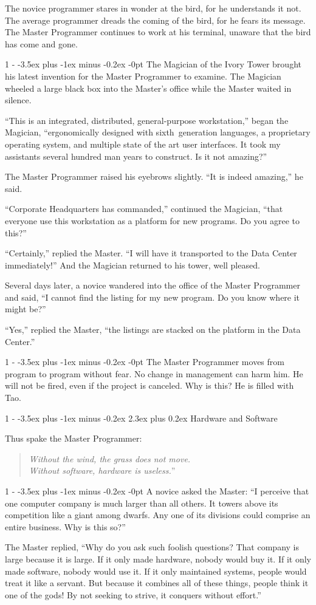 \documentclass[12pt,letterpaper,titlepage]{article}
\makeatletter
\newlength{\intomargin}\setlength{\intomargin}{25pt}
\renewcommand{\section}{%
\@startsection{section}%
{1}%
{-\intomargin}%
{-3.5ex plus -1ex minus -0.2ex}%
{2.3ex plus 0.2ex}%
{\clearpage\normalfont\Large\bfseries\color{my-red}}%
}
\renewcommand{\subsection}{%
\@startsection{subsection}%
{1}%
{-\intomargin}%
{-3.5ex plus -1ex minus -0.2ex}%
{-0pt}%
{\normalfont\normalsize\bfseries\color{my-red}}%
}
\newcommand{\book}[2]{\section{#1}%
\par\hspace{-\intomargin}Thus spake the Master Programmer:%
\begin{quotation}\color{my-gray}\noindent\llap{``}\textsl{#2}''\end{quotation}\medskip}
\newcommand{\sect}{\subsection{}}
\makeatother
\begin{document}
The novice programmer stares in wonder at the bird, for he understands
it not. The average programmer dreads the coming of the bird, for he
fears its message. The Master Programmer continues to work at his
terminal, unaware that the bird has come and gone.

\sect
The Magician of the Ivory Tower brought his latest invention for the
Master Programmer to examine. The Magician wheeled a large black box
into the Master's office while the Master waited in silence.

``This is an integrated, distributed, general-purpose workstation,''
began the Magician, ``ergonomically designed with sixth~generation languages, a proprietary operating
system, and multiple state of the art user interfaces. It took my assistants several hundred man
years to construct. Is it not amazing?''

The Master Programmer raised his eyebrows slightly. ``It is indeed
amazing,'' he said.

``Corporate Headquarters has commanded,'' continued the Magician,
``that everyone use this workstation as a platform for new
programs. Do you agree to this?''

``Certainly,'' replied the Master. ``I will have it transported to the
Data Center immediately!'' And the Magician returned to his tower,
well pleased.

Several days later, a novice wandered into the office of the Master
Programmer and said, ``I cannot find the listing for my new
program. Do you know where it might be?''

``Yes,'' replied the Master, ``the listings are stacked on the
platform in the Data Center.''

\sect
The Master Programmer moves from program to program without fear. No
change in management can harm him. He will not be fired, even if the
project is canceled. Why is this? He is filled with Tao.

\book{Hardware and Software}%
{Without the wind, the grass does not move.\\ Without software,
hardware is useless.}

\sect
A novice asked the Master: ``I perceive that one computer company is
much larger than all others. It towers above its competition like a
giant among dwarfs. Any one of its divisions could comprise an entire
business. Why is this so?''

The Master replied, ``Why do you ask such foolish questions? That
company is large because it is large. If it only made hardware, nobody
would buy it. If it only made software, nobody would use it. If it
only maintained systems, people would treat it like a servant. But
because it combines all of these things, people think it one of the
gods! By not seeking to strive, it conquers without effort.''
\end{document}
